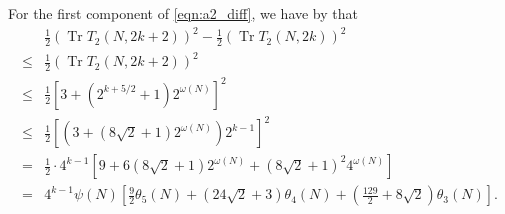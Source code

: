 \documentclass[11pt,letterpaper,reqno]{amsart}
\numberwithin{figure}{section}
\numberwithin{table}{section}
\theoremstyle{definition}
\theoremstyle{plain}
\newcommand{\lrp}[1]{\left(#1\right)}
\newcommand{\lrb}[1]{\left[#1\right]}
\theoremstyle{definition}
\theoremstyle{definition}
\theoremstyle{remark}
\numberwithin{equation}{section}
\DeclareMathOperator{\Tr}{Tr}
\begin{document}
For the first component of \eqref{eqn:a2_diff}, we have by \cite[Proposition 4.6]{previousPaper} that
\begin{align}
    & \frac{1}{2}(\Tr T_2(N, 2k+2))^2 - \frac{1}{2}(\Tr T_2(N, 2k))^2 \\
    \leq &\frac{1}{2}(\Tr T_2(N, 2k+2))^2 \\
    \leq &
    \frac12 \lrb{  
    3 + (2^{k+5/2} + 1) 2^{\omega(N)}
    }^2 \\
    \leq & 
    \frac12 \lrb{ \lrp{ 
    3 + (8\sqrt{2} + 1)  2^{\omega(N)} } 2^{k-1}
    }^2 \\
    =&  \frac12\cdot 4^{k-1} \lrb{
        9 + 6(8\sqrt{2} + 1)  2^{\omega(N)} +  (8\sqrt{2} + 1)^2 4^{\omega(N)}
    } \\
    =& 4^{k-1} \psi(N) \lrb{ 
        \frac92 \theta_5(N) + \lrp{24\sqrt{2} + 3} \theta_4(N) + \lrp{\frac{129}{2} + 8\sqrt{2}} \theta_3(N)
    }.
    \label{eqn:component1}
\end{align}
\end{document}
